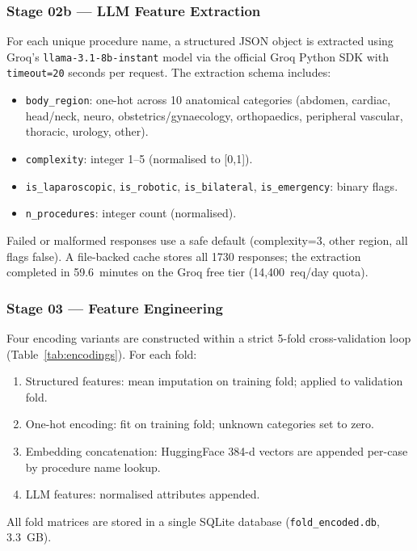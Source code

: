 \documentclass[11pt,twocolumn]{article}
\begin{document}
\subsubsection{Stage 02b — LLM Feature Extraction}
For each unique procedure name, a structured JSON object is extracted using
Groq's \texttt{llama-3.1-8b-instant} model via the official Groq Python SDK with
\texttt{timeout=20} seconds per request.  The extraction schema includes:
\begin{itemize}
  \item \texttt{body\_region}: one-hot across 10 anatomical categories
        (abdomen, cardiac, head/neck, neuro, obstetrics/gynaecology,
        orthopaedics, peripheral vascular, thoracic, urology, other).
  \item \texttt{complexity}: integer 1--5 (normalised to [0,1]).
  \item \texttt{is\_laparoscopic}, \texttt{is\_robotic}, \texttt{is\_bilateral},
        \texttt{is\_emergency}: binary flags.
  \item \texttt{n\_procedures}: integer count (normalised).
\end{itemize}
Failed or malformed responses use a safe default (complexity=3, other region,
all flags false).  A file-backed cache stores all \num{1730} responses;
the extraction completed in 59.6~minutes on the Groq free tier
(14,400~req/day quota).

\subsubsection{Stage 03 — Feature Engineering}
Four encoding variants are constructed within a strict 5-fold cross-validation
loop (Table~\ref{tab:encodings}).  For each fold:
\begin{enumerate}
  \item Structured features: mean imputation on training fold; applied to
        validation fold.
  \item One-hot encoding: fit on training fold; unknown categories set to zero.
  \item Embedding concatenation: HuggingFace 384-d vectors are appended
        per-case by procedure name lookup.
  \item LLM features: normalised attributes appended.
\end{enumerate}
All fold matrices are stored in a single SQLite database
(\texttt{fold\_encoded.db}, 3.3~GB).
\end{document}
